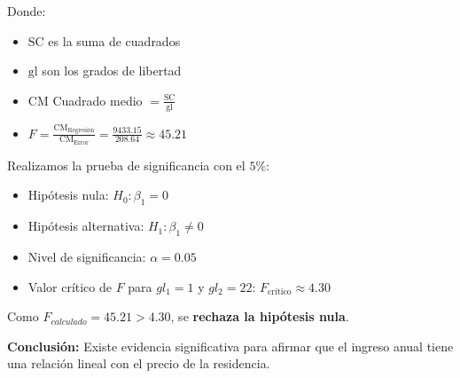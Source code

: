 \documentclass[12pt,a4paper]{article}
\begin{document}
Donde:
\begin{itemize}
    \item \( \text{SC} \) es la suma de cuadrados
    \item \( \text{gl} \) son los grados de libertad
    \item \( \text{CM} \) Cuadrado medio \( = \frac{\text{SC}}{\text{gl}} \)
    \item \( F = \frac{\text{CM}_{\text{Regresión}}}{\text{CM}_{\text{Error}}} = \frac{9433.15}{208.64} \approx 45.21 \)
\end{itemize}
Realizamos la prueba de significancia con el $5\%:$

\begin{itemize}
    \item Hipótesis nula: \( H_0 : \beta_1 = 0 \)
    \item Hipótesis alternativa: \( H_1 : \beta_1 \ne 0 \)
    \item Nivel de significancia: \( \alpha = 0.05 \)
    \item Valor crítico de \( F \) para \( gl_1 = 1 \) y \( gl_2 = 22 \): \( F_{\text{crítico}} \approx 4.30 \)
\end{itemize}

Como \( F_{calculado} = 45.21 > 4.30 \), se \textbf{rechaza la hipótesis nula}.

\bigskip

\textbf{Conclusión:} Existe evidencia significativa para afirmar que el ingreso anual tiene una relación lineal con el precio de la residencia.
\end{document}
